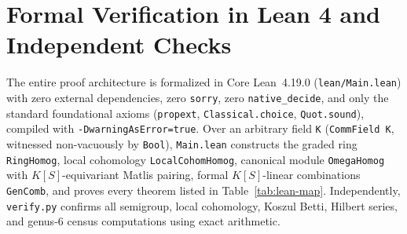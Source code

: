 \documentclass[11pt]{article}
\theoremstyle{definition}
\theoremstyle{remark}
\begin{document}
\section{Formal Verification in Lean 4 and Independent Checks}

The entire proof architecture is formalized in Core Lean~4.19.0 (\texttt{lean/Main.lean}) with zero external dependencies, zero \texttt{sorry}, zero \texttt{native\_decide}, and only the standard foundational axioms (\texttt{propext}, \texttt{Classical.choice}, \texttt{Quot.sound}), compiled with \texttt{-DwarningAsError=true}. Over an arbitrary field \texttt{K} (\texttt{CommField K}, witnessed non-vacuously by \texttt{Bool}), \texttt{Main.lean} constructs the graded ring \texttt{RingHomog}, local cohomology \texttt{LocalCohomHomog}, canonical module \texttt{OmegaHomog} with $K[S]$-equivariant Matlis pairing, formal $K[S]$-linear combinations \texttt{GenComb}, and proves every theorem listed in Table~\ref{tab:lean-map}. Independently, \texttt{verify.py} confirms all semigroup, local cohomology, Koszul Betti, Hilbert series, and genus-$6$ census computations using exact arithmetic.
\end{document}
